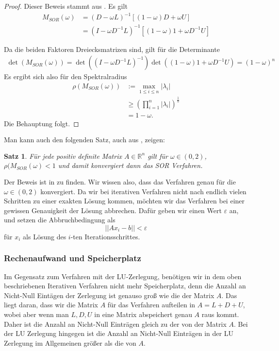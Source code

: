 \documentclass[smallheadings]{scrartcl}
\newtheorem{theorem}{Satz}
\theoremstyle{definition}
\begin{document}
			\begin{proof}
			Dieser Beweis stammt aus \citep{konvergenz}. Es gilt 
			\begin{align*}
			M_{SOR}(\omega )&=(D-\omega L)^{-1}[(1-\omega )D+\omega U]
			\\&=(I-\omega D^{-1}L)^{-1}[(1-\omega )1+\omega D^{-1}U]
			\end{align*}
			
			Da die beiden Faktoren Dreiecksmatrizen sind, gilt für die Determinante
			\begin{align*}
			\det (M_{SOR}(\omega ))=\det ((I-\omega D^{-1}L)^{-1})\det ((1-\omega )1+\omega D^{-1}U)=(1-\omega )^n
			\end{align*}
			Es ergibt sich also für den Spektralradius 
			\begin{align*}
			\rho (M_{SOR}(\omega ))&:=\max_{1\leq i \leq n} |\lambda _i|\\
			&\geq \left( \prod_{i=1}^n|\lambda _i|\right) ^{\frac{1}{n}}
			\\&=1-\omega.
			\end{align*}
			Die Behauptung folgt.
			\end{proof}
			
			Man kann auch den folgenden Satz, auch aus \citep{konvergenz}, zeigen:
			\begin{theorem}
			Für jede positiv definite Matrix $A\in\mathbb{R}^n$ gilt für $\omega \in (0,2)$,
			$\rho (M_{SOR}(\omega )<1$ und damit konvergiert dann das SOR Verfahren.
			\end{theorem}
			Der Beweis ist in \citep{konvergenz} zu finden. 
			Wir wissen also, dass das Verfahren genau für die $\omega \in (0,2)$ konvergiert. 
			Da wir bei iterativen Verfahren nicht nach endlich vielen Schritten zu einer
			exakten Lösung kommen,  möchten wir das Verfahren bei einer gewissen
			Genauigkeit der Lösung abbrechen.  Dafür geben wir einen Wert $\varepsilon$ 
			an, und setzen die Abbruchbedingung als $$||Ax_i-b||<\varepsilon$$ für $x_i$ 
			als Lösung des $i$-ten Iterationsschrittes.  
			
		\subsubsection{Rechenaufwand und Speicherplatz}	
		
		Im Gegensatz zum Verfahren mit der 
		LU-Zerlegung,  benötigen wir in dem oben beschriebenen Iterativen Verfahren 
		nicht mehr Speicherplatz, denn die Anzahl an Nicht-Null Eintägen der Zerlegung 
		ist genauso groß wie die der Matrix $A$. Das liegt daran, dass wir die Matrix $A$ für das Verfahren aufteilen in $A=L+D+U$, wobei aber wenn man $L,D,U$ in eine Matrix abspeichert genau $A$ raus kommt. Daher ist die Anzahl an Nicht-Null Einträgen gleich zu der von der Matrix $A$. Bei der LU Zerlegung hingegen ist die Anzahl an Nicht-Null Einträgen in der LU Zerlegung im Allgemeinen größer als die von $A$.
		
\end{document}
